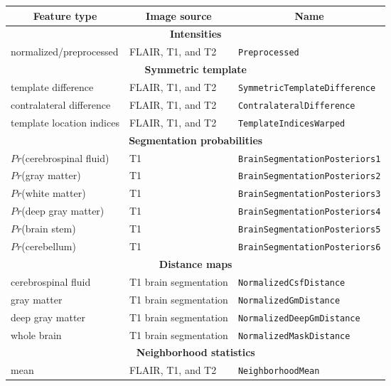 \begin{table}[!htb]
  \centering
  \begin{tabular*}{1.0\textwidth}{@{\extracolsep{\fill}} lll}
    \multicolumn{1}{c}{\textbf{Feature type}} & \multicolumn{1}{c}{\textbf{Image source}} & \multicolumn{1}{c}{\textbf{Name}} \\
    \toprule
    \midrule
    \multicolumn{3}{c}{\textbf{Intensities}} \\
    \midrule
    normalized/preprocessed & FLAIR, T1, and T2 & \texttt{Preprocessed} \\
    \midrule
    \multicolumn{3}{c}{\textbf{Symmetric template}} \\
    \midrule
    template difference & FLAIR, T1, and T2 & \texttt{SymmetricTemplateDifference}\\
    contralateral difference & FLAIR, T1, and T2 & \texttt{ContralateralDifference}\\
    template location indices & FLAIR, T1, and T2 & \texttt{TemplateIndicesWarped}\\
    \midrule
    \multicolumn{3}{c}{\textbf{Segmentation probabilities}} \\
    \midrule
    $Pr$(cerebrospinal fluid) & T1 & \texttt{BrainSegmentationPosteriors1}\\
    $Pr$(gray matter) & T1 & \texttt{BrainSegmentationPosteriors2}\\
    $Pr$(white matter) & T1 & \texttt{BrainSegmentationPosteriors3}\\
    $Pr$(deep gray matter) & T1 & \texttt{BrainSegmentationPosteriors4}\\
    $Pr$(brain stem) & T1 & \texttt{BrainSegmentationPosteriors5}\\
    $Pr$(cerebellum) & T1 & \texttt{BrainSegmentationPosteriors6}\\
    \midrule
    \multicolumn{3}{c}{\textbf{Distance maps}} \\
    \midrule
    cerebrospinal fluid & T1 brain segmentation & \texttt{NormalizedCsfDistance}\\
    gray matter & T1 brain segmentation & \texttt{NormalizedGmDistance}\\
    deep gray matter & T1 brain segmentation & \texttt{NormalizedDeepGmDistance}\\
    whole brain & T1 brain segmentation & \texttt{NormalizedMaskDistance}\\
    \midrule
    \multicolumn{3}{c}{\textbf{Neighborhood statistics}} \\
    \midrule
    mean & FLAIR, T1, and T2 & \texttt{NeighborhoodMean}\\

\end{tabular*}
\end{table}
